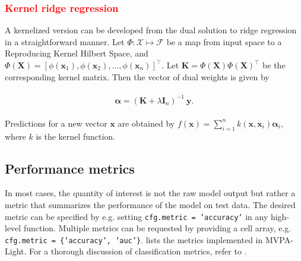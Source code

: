 \documentclass[utf8]{frontiersSCNS} %
\newcommand{\al}{\boldsymbol{\alpha}}
\newcommand{\x}{\mathbf{x}}
\newcommand{\y}{\mathbf{y}}
\newcommand{\I}{\mathbf{I}}
\newcommand{\K}{\mathbf{K}}
\newcommand{\X}{\mathbf{X}}
\newcommand{\ttt}[1]{\texttt{#1}}
\newcommand{\red}[1]{\textcolor{red}{#1}}
\begin{document}
\red{\subsubsection{Kernel ridge regression}}

A kernelized version can be developed from the dual solution to ridge regression in a straightforward manner. Let $\Phi:\mathcal{X}\mapsto\mathcal{F}$ be a map from input space to a Reproducing Kernel Hilbert Space, and $\Phi(\X) = [\phi(\x_1),\phi(\x_2),...,\phi(\x_n)]^\top$. Let $\K = \Phi(\X)\Phi(\X)^\top$ be the corresponding kernel matrix. Then the vector of dual weights is given by  

\begin{align}
\begin{split}
\label{eq:kernel_ridge}
\al = (\K + \lambda\I_n)^{-1}\ \y.
\end{split}
\end{align}

Predictions for a new vector $\x$ are obtained by $f(\x) = \sum_{i=1}^n k(\x, \x_i)\al_i$, where $k$ is the kernel function.


\subsection{Performance metrics}\label{sec:metrics}

In most cases, the quantity of interest is not the raw model output but rather a metric that summarizes the performance of the model on test data. The desired metric can be specified by e.g. setting \ttt{cfg.metric = 'accuracy'} in any high-level function. Multiple metrics can be requested by providing a cell array, e.g. \ttt{cfg.metric = \{'accuracy', 'auc'\}}.  lists the metrics implemented in MVPA-Light. For a thorough discussion of classification metrics, refer to  \cite{Sokolova2009ATasks}.
\end{document}
